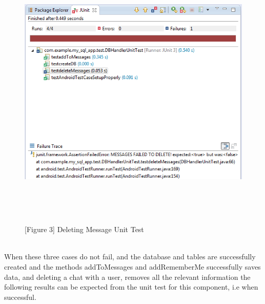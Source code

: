\documentclass[29pt,a4paper]{moderncv}
\begin{document}
	\begin{figure}
				\centering
				\\ \includegraphics[width=6.0in, height=5.0in]{./deletechat.png}
				\\\caption{[Figure 3] Deleting Message Unit Test}
	\end{figure}\\
\newpage	
	When these three cases do not fail, and the database and tables are successfully created and the methods addToMessages and addRememberMe successfully saves data, and deleting a chat with a user, removes all the relevant information the following results can be expected from the unit test for this component, i.e when successful.\\
	
\end{document}
